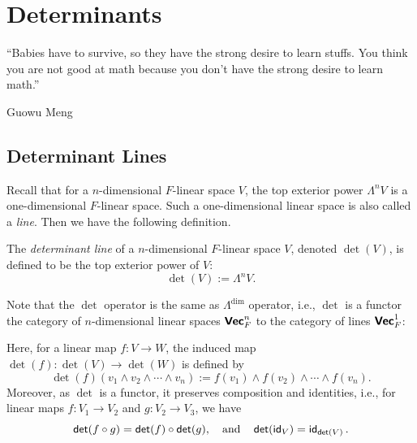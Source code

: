 \chapter{Determinants}

\epigraph{``Babies have to survive, so they have the strong desire to learn stuffs. You think you are not good at math because you don't have the strong desire to learn math.''}{Guowu Meng}

\section{Determinant Lines}

Recall that for a $n$-dimensional $F$-linear space $V$, the top exterior power $\Lambda^n V$ is a one-dimensional $F$-linear space. Such a one-dimensional linear space is also called a \emph{line}. Then we have the following definition.

\begin{definition}\label{def:determinant_line}
  The \emph{determinant line} of a $n$-dimensional $F$-linear space $V$, denoted $\det(V)$, is defined to be the top exterior power of $V$:
  \[
    \det(V) := \Lambda^n V.
  \]
\end{definition}

Note that the $\det$ operator is the same as $\Lambda^{\dim}$ operator, i.e., $\det$ is a functor the category of $n$-dimensional linear spaces $\operatorname{\text{\normalfont\bf\sffamily Vec}}_F^n$ to the category of lines $\operatorname{\text{\normalfont\bf\sffamily Vec}}_F^1$:
\begin{center}
\end{center}
Here, for a linear map $f \colon V \to W$, the induced map $\det(f) \colon \det(V) \to \det(W)$ is defined by
\[
  \det(f)(v_1 \wedge v_2 \wedge \cdots \wedge v_n) := f(v_1) \wedge f(v_2) \wedge \cdots \wedge f(v_n).
\]
Moreover, as $\det$ is a functor, it preserves composition and identities, i.e., for linear maps $f \colon V_1 \to V_2$ and $g \colon V_2 \to V_3$, we have
\[
  \operatorname{\text{\normalfont\sffamily det}}(f \circ g) = \operatorname{\text{\normalfont\sffamily det}}(f) \circ \operatorname{\text{\normalfont\sffamily det}}(g), \quad \text{and} \quad \operatorname{\text{\normalfont\sffamily det}}(\operatorname{\text{\normalfont\sffamily id}}_{V}) = \operatorname{\text{\normalfont\sffamily id}}_{\operatorname{\text{\normalfont\sffamily det}}(V)}.
\]

